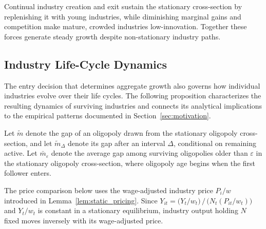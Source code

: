\documentclass[12pt]{article}
\begin{document}
Continual industry creation and exit sustain the stationary cross-section by replenishing it with young industries, while diminishing marginal gains and competition make mature, crowded industries low-innovation. Together these forces generate steady growth despite non-stationary industry paths.

\subsection{Industry Life-Cycle Dynamics}\label{subsec:lifecycle}

The entry decision that determines aggregate growth also governs how individual industries evolve over their life cycles. The following proposition characterizes the resulting dynamics of surviving industries and connects its analytical implications to the empirical patterns documented in Section~\ref{sec:motivation}.

Let \(\tilde m\) denote the gap of an oligopoly drawn from the stationary oligopoly cross-section, and let \(\tilde m_\Delta\) denote its gap after an interval \(\Delta\), conditional on remaining active. Let \(\bar m_\varepsilon\) denote the average gap among surviving oligopolies older than \(\varepsilon\) in the stationary oligopoly cross-section, where oligopoly age begins when the first follower enters.

The price comparison below uses the wage-adjusted industry price \(P_i/w\) introduced in Lemma~\ref{lem:static_pricing}. Since \(Y_{it} = \big(Y_t/w_t\big)\, /\, \big(N_t(P_{it}/w_t)\big)\) and \(Y_t/w_t\) is constant in a stationary equilibrium, industry output holding \(N\) fixed moves inversely with its wage-adjusted price.
\end{document}
